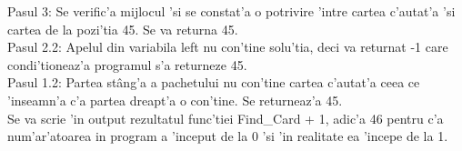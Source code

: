 \newline
Pasul 3: Se verific'a mijlocul 'si se constat'a o potrivire 'intre cartea c'autat'a 'si cartea de la pozi'tia 45. Se va returna 45.\\
\newline
Pasul 2.2: Apelul din variabila left nu con'tine solu'tia, deci va returnat -1 care condi'tioneaz'a programul s'a returneze 45.\\
\newline
Pasul 1.2: Partea st\^ang'a a pachetului nu con'tine cartea c'autat'a ceea ce 'inseamn'a c'a partea dreapt'a o con'tine. Se returneaz'a 45.\\
\newline
Se va scrie 'in output rezultatul func'tiei Find\_Card + 1, adic'a 46 pentru c'a num'ar'atoarea in program a 'inceput de la 0 'si 'in realitate ea 'incepe de la 1.